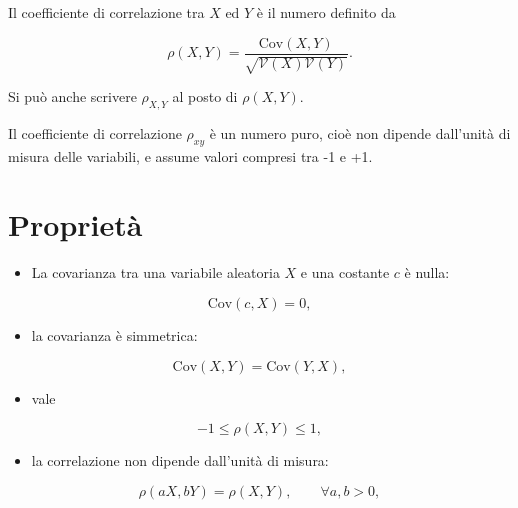 \documentclass[
  11pt,
]{krantz}
\providecommand{\tightlist}{%
  \setlength{\itemsep}{0pt}\setlength{\parskip}{0pt}}
\theoremstyle{definition}
\theoremstyle{definition}
\theoremstyle{definition}
\theoremstyle{definition}
\theoremstyle{remark}
\begin{document}
Il coefficiente di correlazione tra \(X\) ed \(Y\) è il numero definito da

\begin{equation}
\rho(X,Y) =\frac{\mbox{Cov}(X,Y)}{\sqrt{\mathcal{V}(X)\mathcal{V}(Y)}}.
\end{equation}

Si può anche scrivere \(\rho_{X,Y}\) al posto di \(\rho(X,Y)\).

Il coefficiente di correlazione \(\rho_{xy}\) è un numero puro, cioè non dipende dall'unità di misura delle variabili, e assume valori compresi tra -1 e +1.

\hypertarget{proprietuxe0}{%
\section{Proprietà}\label{proprietuxe0}}

\begin{itemize}
\tightlist
\item
  La covarianza tra una variabile aleatoria \(X\) e una costante \(c\) è nulla:
\end{itemize}

\begin{equation}
\mbox{Cov}(c,X) = 0,
\end{equation}

\begin{itemize}
\tightlist
\item
  la covarianza è simmetrica:
\end{itemize}

\begin{equation}
\mbox{Cov}(X,Y) = \mbox{Cov}(Y,X),
\end{equation}

\begin{itemize}
\tightlist
\item
  vale
\end{itemize}

\begin{equation}
 -1 \leq \rho(X,Y) \leq 1,
\end{equation}

\begin{itemize}
\tightlist
\item
  la correlazione non dipende dall'unità di misura:
\end{itemize}

\begin{equation}
 \rho(aX, bY) = \rho(X,Y), \qquad \forall a, b > 0,
\end{equation}
\end{document}
